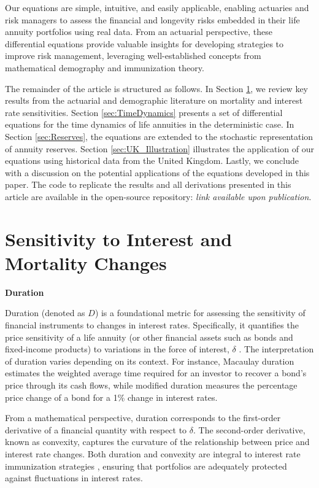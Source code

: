 \documentclass[12pt]{article}
\begin{document}
Our equations are simple, intuitive, and easily applicable, enabling actuaries and risk managers to assess the financial and longevity risks embedded in their life annuity portfolios using real data. From an actuarial perspective, these differential equations provide valuable insights for developing strategies to improve risk management, leveraging well-established concepts from mathematical demography and immunization theory.

The remainder of the article is structured as follows. In Section \ref{sec:SensitivityMortalityInterest}, we review key results from the actuarial and demographic literature on mortality and interest rate sensitivities. Section \ref{sec:TimeDynamics} presents a set of differential equations for the time dynamics of life annuities in the deterministic case. In Section \ref{sec:Reserves}, the equations are extended to the stochastic representation of annuity reserves. Section \ref{sec:UK_Illustration} illustrates the application of our equations using historical data from the United Kingdom. Lastly, we conclude with a discussion on the potential applications of the equations developed in this paper. The code to replicate the results and all derivations presented in this article are available in the open-source repository: \textit{link available upon publication}.



\section{Sensitivity to Interest and Mortality Changes}\label{sec:SensitivityMortalityInterest}

\textbf{Duration}

Duration (denoted as $D$) is a foundational metric for assessing the sensitivity of financial instruments to changes in interest rates. Specifically, it quantifies the price sensitivity of a life annuity (or other financial assets such as bonds and fixed-income products) to variations in the force of interest, $\delta$ \citep{milevsky2013life,charupat2016sluggish}. The interpretation of duration varies depending on its context. For instance, Macaulay duration estimates the weighted average time required for an investor to recover a bond's price through its cash flows, while modified duration measures the percentage price change of a bond for a 1\% change in interest rates.

From a mathematical perspective, duration corresponds to the first-order derivative of a financial quantity with respect to $\delta$. The second-order derivative, known as convexity, captures the curvature of the relationship between price and interest rate changes. Both duration and convexity are integral to interest rate immunization strategies \citep{redington1951papers,fisher1971coping,shiu1990redington,santomero1997financial,courtois2007immunization}, ensuring that portfolios are adequately protected against fluctuations in interest rates.
\end{document}
